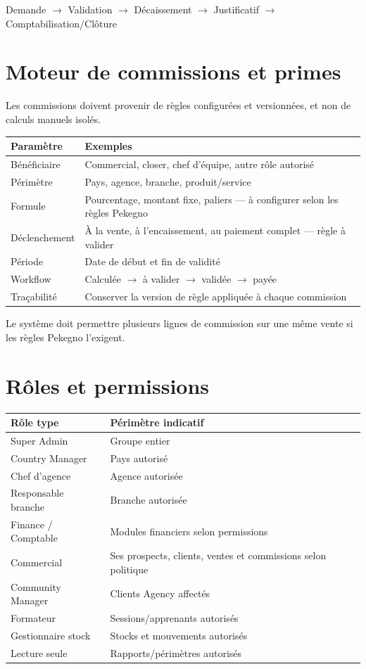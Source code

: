 \documentclass[11pt,a4paper]{article}
\newcommand{\tableheader}[2]{\textbf{#1} & \textbf{#2} \\ \hline}
\begin{document}
Demande $\rightarrow$ Validation $\rightarrow$ Décaissement $\rightarrow$ Justificatif $\rightarrow$ Comptabilisation/Clôture

\section{Moteur de commissions et primes}

Les commissions doivent provenir de règles configurées et versionnées, et non de calculs manuels isolés.

\begin{tabularx}{\textwidth}{|l|X|}
\hline
\tableheader{Paramètre}{Exemples}
Bénéficiaire & Commercial, closer, chef d'équipe, autre rôle autorisé \\ \hline
Périmètre & Pays, agence, branche, produit/service \\ \hline
Formule & Pourcentage, montant fixe, paliers --- à configurer selon les règles Pekegno \\ \hline
Déclenchement & À la vente, à l'encaissement, au paiement complet --- règle à valider \\ \hline
Période & Date de début et fin de validité \\ \hline
Workflow & Calculée $\rightarrow$ à valider $\rightarrow$ validée $\rightarrow$ payée \\ \hline
Traçabilité & Conserver la version de règle appliquée à chaque commission \\ \hline
\end{tabularx}

Le système doit permettre plusieurs lignes de commission sur une même vente si les règles Pekegno l'exigent.

\section{Rôles et permissions}

\begin{tabularx}{\textwidth}{|l|X|}
\hline
\tableheader{Rôle type}{Périmètre indicatif}
Super Admin & Groupe entier \\ \hline
Country Manager & Pays autorisé \\ \hline
Chef d'agence & Agence autorisée \\ \hline
Responsable branche & Branche autorisée \\ \hline
Finance / Comptable & Modules financiers selon permissions \\ \hline
Commercial & Ses prospects, clients, ventes et commissions selon politique \\ \hline
Community Manager & Clients Agency affectés \\ \hline
Formateur & Sessions/apprenants autorisés \\ \hline
Gestionnaire stock & Stocks et mouvements autorisés \\ \hline
Lecture seule & Rapports/périmètres autorisés \\ \hline
\end{tabularx}
\end{document}
